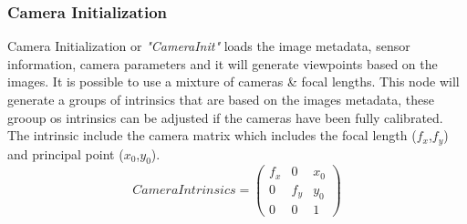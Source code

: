 \documentclass[12pt]{report}
\begin{document}
\subsubsection{Camera Initialization}
Camera Initialization or \textit{"CameraInit"} loads the image metadata, sensor information, camera parameters and it will  generate viewpoints based on the images.
It is possible to use a mixture of cameras \& focal lengths. This node will generate a groups of intrinsics that are based on the images metadata, these grooup os intrinsics can be adjusted if the cameras have been fully calibrated.
The intrinsic include the camera matrix  which includes the focal length ($f_x$,$f_y$) and principal point ($x_0$,$y_0$).
\begin{equation*}
  Camera Intrinsics = 
  \begin{pmatrix}
  f_x & 0 & x_0 \\
  0 & f_y & y_0 \\
  0 & 0 & 1
  \end{pmatrix}
\end{equation*}
\label{equ:camera_intrisics}
\end{document}
